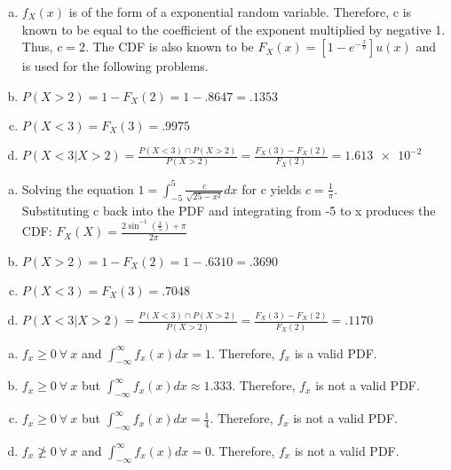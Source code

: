 \documentclass[12pt]{article}
\newenvironment{problem}[2][Problem]{\begin{trivlist}
\item[\hskip \labelsep {\bfseries #1}\hskip \labelsep {\bfseries #2.}]
  \vspace{1 cm}
}{\end{trivlist}}
\begin{document}
\begin{problem}{3.13}
\item
  \begin{enumerate}[a.]
    \item %
      $f_X(x)$ is of the form of a exponential random variable. Therefore,
      c is known to be equal to the coefficient of the exponent multiplied
      by negative 1. Thus, $c = 2$. The CDF is also known to be 
      $F_X(x) = \left[1 - e^{-\frac{x}{b}}\right]u(x)$ and is used for the 
      following problems. 
    \item %
      $P(X>2) = 1 - F_X(2) = 1 - .8647 = .1353$
    \item %
      $P(X<3) = F_X(3) = .9975$
    \item %
      $P(X < 3|X>2) = \frac{P(X<3)\cap P(X>2)}{P(X>2)}
      = \frac{F_X(3) - F_X(2)}{F_X(2)} = \num{1.613e-2}$
  \end{enumerate}
\end{problem}

\begin{problem}{3.15}
\item
  \begin{enumerate}[a.]
    \item %
    Solving the equation $1 = \int_{-5}^5 \frac{c}{\sqrt{25-x^2}}dx$ for c
      yields $c = \frac{1}{\pi}$. \\
      Substituting c back into the PDF and integrating from -5 to x produces
      the CDF: $F_X(X) = \frac{2\sin^{-1}(\frac{x}{5})+\pi}{2\pi}$
    \item %
      $P(X>2) = 1 - F_X(2) = 1 - .6310 = .3690$
    \item %
      $P(X<3) = F_X(3) = .7048$
    \item %
      $P(X < 3|X>2) = \frac{P(X<3)\cap P(X>2)}{P(X>2)}
      = \frac{F_X(3) - F_X(2)}{F_X(2)} = .1170$
  \end{enumerate}
\end{problem}

\begin{problem}{3.17}
\item
  \begin{enumerate}[a.]
    \item %
      $f_x \geq 0 \ \forall \ x$ and $\int_{-\infty}^{\infty} f_x(x)dx = 1$.
      Therefore, $f_x$ is a valid PDF.
    \item %
      $f_x \geq 0 \ \forall \ x$ but $\int_{-\infty}^{\infty} f_x(x)dx \approx 1.333$.
      Therefore, $f_x$ is not a valid PDF.
    \item %
      $f_x \geq 0 \ \forall \ x$ but $\int_{-\infty}^{\infty} f_x(x)dx =
      \frac{1}{4}$. Therefore, $f_x$ is not a valid PDF.
    \item %
      $f_x \ngeq 0 \ \forall \ x$ and $\int_{-\infty}^{\infty} f_x(x)dx = 0$.
      Therefore, $f_x$ is not a valid PDF.
  \end{enumerate}
\end{problem}
\end{document}

